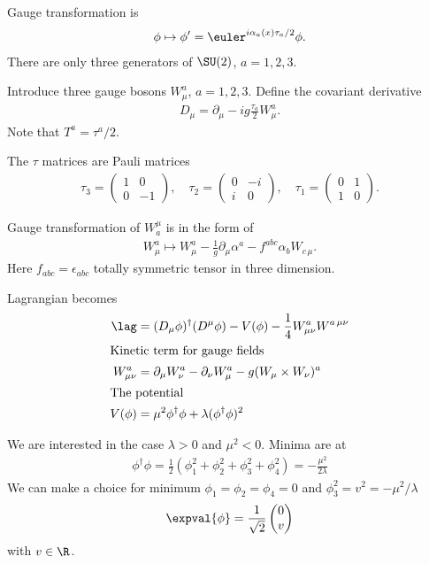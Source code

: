 Gauge transformation is
\begin{align}
   \phi \mapsto \phi'=\euler^{i\alpha_a(x) \tau_a / 2} \phi.
\end{align}
There are only three generators of $\SU(2)$, $a=1,2,3$.

Introduce three gauge bosons $W_\mu^a$, $a=1,2,3$. Define the covariant derivative
\begin{align}
   D_\mu = \partial_\mu - ig \frac{\tau_a}{2} W_\mu^a.
\end{align}
Note that $T^a = {\tau^a} / {2}$.

The $\tau$ matrices are Pauli matrices
\begin{align}
   \tau_3 = \begin{pmatrix} 1 & 0 \\ 0 & -1\end{pmatrix},   \quad 
   \tau_2 = \begin{pmatrix} 0 & -i \\ i & 0\end{pmatrix}, \quad
   \tau_1  = \begin{pmatrix} 0 & 1 \\ 1 & 0\end{pmatrix}.
\end{align}

Gauge transformation of $W_a^\mu$ is in the form of
\begin{align}
W_\mu^a \mapsto W_\mu^a - \frac{1}{g} \partial_\mu \alpha^a - f^{abc} \alpha_b W_{c \,\mu} .
\end{align}
Here $f_{abc} = \epsilon_{abc}$ totally symmetric tensor in three dimension.

Lagrangian becomes
\begin{align}
   \lag &= (D_\mu \phi)^\dagger (D^\mu \phi) - V(\phi) - \frac{1}{4} W_{\mu\nu}^a W^{a \, \mu\nu} \\
   \shortintertext{Kinetic term for gauge fields}
   W_{\mu\nu}^a &= \partial_\mu W_\nu^a - \partial_\nu W_\mu^a - g (W_\mu \times W_\nu)^a \\
   \shortintertext{The potential}
   V(\phi) &= \mu^2 \phi^\dagger \phi + \lambda (\phi^\dagger \phi)^2
\end{align}

We are interested in the case $\lambda > 0$ and $\mu^2 < 0$. Minima are at
\begin{align*}
   \phi^\dagger \phi = \frac{1}{2} \left( \phi_1^2 + \phi_2^2 + \phi_3^2 + \phi_4^2 \right) = - \frac{\mu^2}{2\lambda}
\end{align*}
We can make a choice for minimum $\phi_1 = \phi_2 = \phi_4 = 0$ and $\phi_3^2 = v^2 = - {\mu^2}/{\lambda}$ 
\begin{align}
   \expval{\phi} = \frac{1}{\sqrt{2}} \begin{pmatrix} 0 \\ v\end{pmatrix}
\end{align}
with $v \in \R$.

